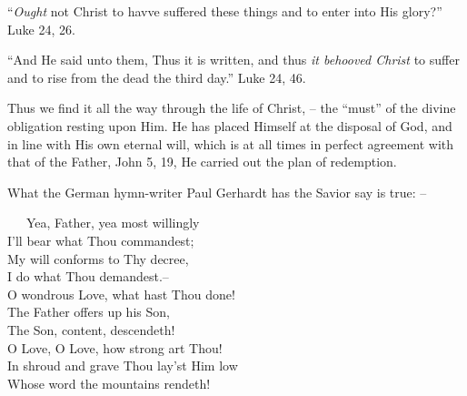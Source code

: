 \documentclass[
]{book}
\begin{document}
``\emph{Ought} not Christ to havve suffered these things and to enter into His glory?'' Luke 24, 26.

``And He said unto them, Thus it is written, and thus \emph{it behooved Christ} to suffer and to rise from the dead the third day.'' Luke 24, 46.

Thus we find it all the way through the life of Christ, -- the ``must'' of the divine obligation resting upon Him. He has placed Himself at the disposal of God, and in line with His own eternal will, which is at all times in perfect agreement with that of the Father, John 5, 19, He carried out the plan of redemption.

What the German hymn-writer Paul Gerhardt has the Savior say is true: --

~~~Yea, Father, yea most willingly\\
\hspace*{0.333em}\hspace*{0.333em}\hspace*{0.333em}I'll bear what Thou commandest;\\
\hspace*{0.333em}\hspace*{0.333em}\hspace*{0.333em}My will conforms to Thy decree,\\
\hspace*{0.333em}\hspace*{0.333em}\hspace*{0.333em}I do what Thou demandest.--\\
\hspace*{0.333em}\hspace*{0.333em}\hspace*{0.333em}O wondrous Love, what hast Thou done!\\
\hspace*{0.333em}\hspace*{0.333em}\hspace*{0.333em}The Father offers up his Son,\\
\hspace*{0.333em}\hspace*{0.333em}\hspace*{0.333em}The Son, content, descendeth!\\
\hspace*{0.333em}\hspace*{0.333em}\hspace*{0.333em}O Love, O Love, how strong art Thou!\\
\hspace*{0.333em}\hspace*{0.333em}\hspace*{0.333em}In shroud and grave Thou lay'st Him low\\
\hspace*{0.333em}\hspace*{0.333em}\hspace*{0.333em}Whose word the mountains rendeth!
\end{document}

